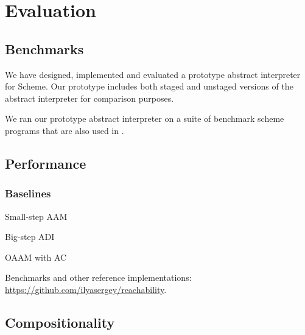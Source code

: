 \section{Evaluation} \label{evaluation}

\subsection{Benchmarks}

We have designed, implemented and evaluated a prototype abstract interpreter for Scheme.
Our prototype includes both staged and unstaged versions of the abstract interpreter for comparison 
purposes.

We ran our prototype abstract interpreter on a suite of benchmark scheme programs that are also used 
in \cite{Johnson:2013:OAA:2500365.2500604, ashley:practical}. 


\subsection{Performance}

\subsubsection{Baselines}
Small-step AAM

Big-step ADI

OAAM with AC \cite{Boucher:1996:ACN:647473.727587, Johnson:2013:OAA:2500365.2500604}

Benchmarks and other reference implementations: \url{https://github.com/ilyasergey/reachability}.

\subsection{Compositionality}

